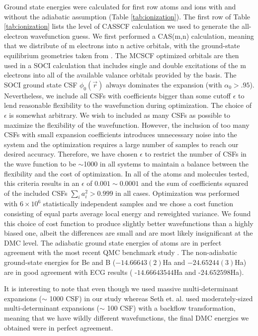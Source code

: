 \documentclass[aps,prl,superscriptaddress,groupedaddress]{revtex4}
\begin{document}
Ground state energies were calculated for first row atoms and ions with and without the adiabatic assumption (Table \ref{tab:ionization}). The first row of Table \ref{tab:ionization} lists the level of CASSCF calculation we used to generate the all-electron wavefunction guess. We first performed a CAS(m,n) calculation, meaning that we distribute of m electrons into n active orbitals, with the ground-state equilibrium geometries taken from \cite{CCCBDB}. The MCSCF optimized orbitals are then used in a SOCI calculation that includes single and double excitations of the m electrons into all of the available valance orbitals provided by the basis. The SOCI ground state CSF $\phi_0(\vec{r})$ always dominates the expansion (with $\alpha_0>.95$). Nevertheless, we include all CSFs with coefficients bigger than some cutoff $\epsilon$ to lend reasonable flexibility to the wavefunction during optimization. The choice of $\epsilon$ is somewhat arbitrary. We wish to included as many CSFs as possible to maximize the flexibility of the wavefunction. However, the inclusion of too many CSFs with small expansion coefficients introduces unnecessary noise into the system and the optimization requires a large number of samples to reach our desired accuracy. Therefore, we have chosen $\epsilon$ to restrict the number of CSFs in the wave function to be $\sim$1000 in all systems to maintain a balance between the flexibility and the cost of optimization. In all of the atoms and molecules tested, this criteria results in an $\epsilon$ of $0.001\sim0.0001$ and the sum of coefficients squared of the included CSFs $\sum\limits_{i}a_i^2 > 0.999$ in all cases. Optimization was performed with $6\times10^6$ statistically independent samples and we chose a cost function consisting of equal parts average local energy and reweighted variance. We found this choice of cost function to produce slightly better wavefunctions than a highly biased one, albeit the differences are small and are most likely insignificant at the DMC level. The adiabatic ground state energies of atoms are in perfect agreement with the most recent QMC benchmark study \cite{Seth_Bench}. The non-adiabatic ground-state energies for Be and B ($-14.66643(2)$Ha and $-24.65244(3)$Ha) are in good agreement with ECG results ( -$14.66643544$Ha \cite{Bubin_BeH_noBO} and -$24.652598$Ha\cite{Bubin_BH_noBO}).

It is interesting to note that even though we used massive multi-determinant expansions ($\sim$ 1000 CSF) in our study whereas Seth et. al. \cite{Seth_Bench} used moderately-sized multi-determinant expansions ($\sim$ 100 CSF) with a backflow transformation, meaning that we have wildly different wavefunctions, the final DMC energies we obtained were in perfect agreement.
\end{document}
